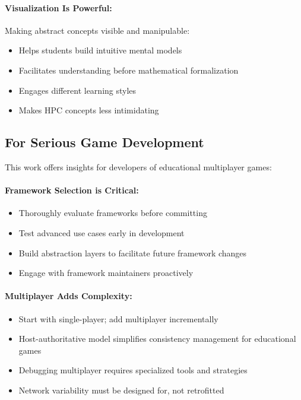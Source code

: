 \paragraph*{Visualization Is Powerful:}

Making abstract concepts visible and manipulable:
\begin{itemize}
    \item Helps students build intuitive mental models
    \item Facilitates understanding before mathematical formalization
    \item Engages different learning styles
    \item Makes HPC concepts less intimidating
\end{itemize}

\subsection{For Serious Game Development}
\label{subsec:implications-serious-games}

This work offers insights for developers of educational multiplayer games:

\paragraph*{Framework Selection is Critical:}

\begin{itemize}
    \item Thoroughly evaluate frameworks before committing
    \item Test advanced use cases early in development
    \item Build abstraction layers to facilitate future framework changes
    \item Engage with framework maintainers proactively
\end{itemize}

\paragraph*{Multiplayer Adds Complexity:}

\begin{itemize}
    \item Start with single-player; add multiplayer incrementally
    \item Host-authoritative model simplifies consistency management for educational games
    \item Debugging multiplayer requires specialized tools and strategies
    \item Network variability must be designed for, not retrofitted
\end{itemize}

